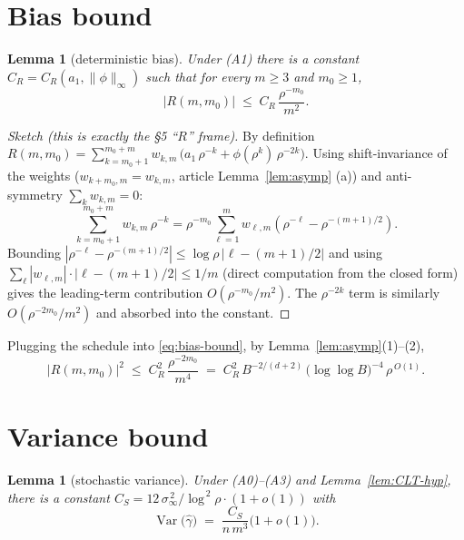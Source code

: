 \documentclass[11pt]{article}
\newcommand{\Var}{\operatorname{Var}}
\theoremstyle{plain}
\newtheorem{lemma}[theorem]{Lemma}
\theoremstyle{definition}
\begin{document}
\section{Bias bound}\label{sec:bias}

\begin{lemma}[deterministic bias]\label{lem:bias}
Under (A1) there is a constant $C_R = C_R(a_1, \|\phi\|_\infty)$ such that
for every $m\ge 3$ and $m_0\ge 1$,
\begin{equation}\label{eq:bias-bound}
  \bigl|R(m,m_0)\bigr|
  \;\le\;
  C_R\,\frac{\rho^{-m_0}}{m^{2}}.
\end{equation}
\end{lemma}

\begin{proof}[Sketch (this is exactly the §5 ``$R$'' frame)]
By definition $R(m,m_0) = \sum_{k=m_0+1}^{m_0+m} w_{k,m}\,
\bigl(a_1\,\rho^{-k} + \phi(\rho^{k})\,\rho^{-2k}\bigr)$. Using
shift-invariance of the weights ($w_{k+m_0,m} = w_{k,m}$, article
Lemma~\ref{lem:asymp} (a)) and anti-symmetry $\sum_k w_{k,m} = 0$:
\[
  \sum_{k=m_0+1}^{m_0+m}\!\!\!\!\! w_{k,m}\,\rho^{-k}
  = \rho^{-m_0}\!\!\sum_{\ell=1}^{m} w_{\ell,m}(\rho^{-\ell} - \rho^{-(m+1)/2}).
\]
Bounding $|\rho^{-\ell} - \rho^{-(m+1)/2}| \le \log\rho\,|\ell - (m+1)/2|$
and using $\sum_\ell|w_{\ell,m}|\cdot|\ell-(m+1)/2| \le 1/m$ (direct
computation from the closed form) gives the leading-term contribution
$O(\rho^{-m_0}/m^{2})$. The $\rho^{-2k}$ term is similarly $O(\rho^{-2m_0}/m^{2})$
and absorbed into the constant.
\end{proof}

Plugging the schedule into \eqref{eq:bias-bound}, by
Lemma~\ref{lem:asymp}(1)--(2),
\begin{equation}\label{eq:bias-rate}
  \bigl|R(m,m_0)\bigr|^{2}
  \;\le\;
  C_R^{2}\,\frac{\rho^{-2m_0}}{m^{4}}
  \;=\;
  C_R^{2}\,B^{-2/(d+2)}\,\bigl(\log\log B\bigr)^{-4}\,\rho^{\,O(1)}.
\end{equation}

\section{Variance bound}\label{sec:variance}

\begin{lemma}[stochastic variance]\label{lem:var}
Under (A0)--(A3) and Lemma~\ref{lem:CLT-hyp}, there is a constant
$C_S = 12\,\sigma_\infty^{\,2}/\log^{\,2}\rho \cdot (1+o(1))$ with
\begin{equation}\label{eq:var-bound}
  \Var\!\bigl(\hat\gamma\bigr)
  \;=\;
  \frac{C_S}{n\,m^{3}}\bigl(1+o(1)\bigr).
\end{equation}
\end{lemma}
\end{document}
